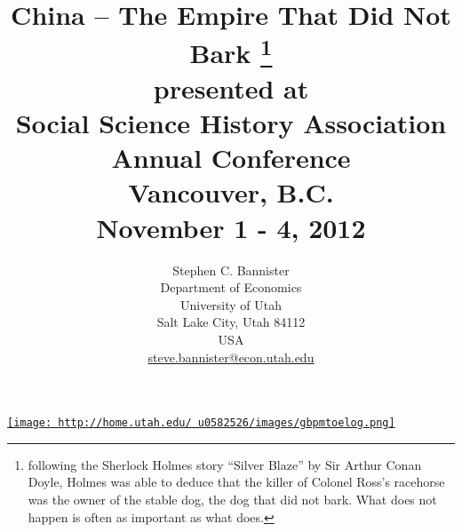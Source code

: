\documentclass[12pt]{article}
\title{China -- The Empire That Did Not Bark \footnote{following the Sherlock Holmes story ``Silver Blaze'' by Sir Arthur Conan Doyle, Holmes was able to deduce that the killer of Colonel Ross's racehorse was the owner of the stable dog, the dog that did not bark. What does not happen is often as important as what does.}\\
presented at\\
Social Science History Association\\
Annual Conference\\
Vancouver, B.C.\\
November 1 - 4, 2012}
\author{Stephen C. Bannister\\
	Department of Economics\\
	University of Utah\\
	Salt Lake City, Utah 84112\\
	USA\\
	\href{mailto:steve.bannister@econ.utah.edu}{steve.bannister@econ.utah.edu}\\
	}
\date{}
\numberwithin{equation}{section}
\begin{document}

%
	\maketitle
	
	
\href{http://home.utah.edu/~u0582526/images/gbpmtoelog.png}{\texttt{[image: http://home.utah.edu/~u0582526/images/gbpmtoelog.png]}}
\end{document}
